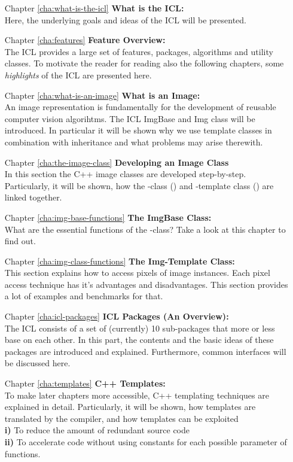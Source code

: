 \begin{itemize}
\item [Chapter \ref{cha:what-is-the-icl}] \textbf{What is the ICL:}\\ Here, the underlying goals and ideas of the ICL will be presented.
\item [Chapter \ref{cha:features}] \textbf{Feature Overview:}\\ The ICL provides a large set of features, packages, algorithms and utility classes. To motivate the reader for reading also the following chapters, some \emph{highlights} of the ICL are presented here.
\item [Chapter \ref{cha:what-is-an-image}] \textbf{What is an Image:}\\ An image representation is fundamentally for the development of reusable computer vision algorihtms. The ICL ImgBase  and Img  class will be introduced. In particular it will be shown why we use template classes in combination with inheritance and what problems may arise therewith. 
\item [Chapter \ref{cha:the-image-class}]\textbf{Developing an Image Class}\\
In this section the C++ image classes are developed step-by-step. Particularly, it will be shown, how the -class () and -template class () are linked together. 
\item [Chapter \ref{cha:img-base-functions}]\textbf{The ImgBase Class:}\\
What are the essential functions of the -class? Take a look at this chapter to find out.
\item [Chapter \ref{cha:img-class-functions}]\textbf{The Img-Template Class:}\\
This section explains how to access pixels of image instances. Each pixel access technique has it's advantages and disadvantages. This section provides a lot of examples and benchmarks for that.
\item [Chapter \ref{cha:icl-packages}]\textbf{ICL Packages (An Overview):}\\ The ICL consists of a set of (currently) 10 sub-packages that more or less base on each other. In this part, the contents and the basic ideas of these packages are introduced and explained. Furthermore, common interfaces will be discussed here.
\item [Chapter \ref{cha:templates}]\textbf{C++ Templates:}\\ To make later chapters more accessible, C++ templating techniques are explained in detail. Particularly, it will be shown, how templates are translated by the compiler, and how templates can be exploited\\
\small{\textbf{i)}} To reduce the amount of redundant source code\\
\small{\textbf{ii)}} To accelerate code without using constants for each possible parameter of functions.    


\end{itemize}
